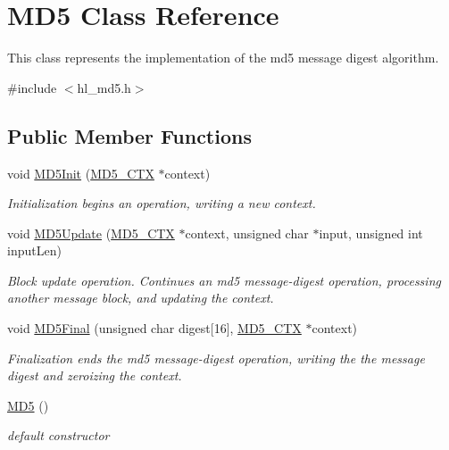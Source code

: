 \hypertarget{class_m_d5}{
\section{MD5 Class Reference}
\label{class_m_d5}
}


This class represents the implementation of the md5 message digest algorithm.  


{\ttfamily \#include $<$hl\_\-md5.h$>$}\subsection*{Public Member Functions}
\begin{DoxyCompactItemize}
\item 
void \hyperlink{class_m_d5_ad7a5fd3b9b97865ded5ac8ecd24905fc}{MD5Init} (\hyperlink{struct_m_d5___c_t_x}{MD5\_\-CTX} $\ast$context)
\begin{DoxyCompactList}\small\item\em Initialization begins an operation, writing a new context. \item\end{DoxyCompactList}\item 
void \hyperlink{class_m_d5_afdab8c1ad9a976589f78a64c534d2c54}{MD5Update} (\hyperlink{struct_m_d5___c_t_x}{MD5\_\-CTX} $\ast$context, unsigned char $\ast$input, unsigned int inputLen)
\begin{DoxyCompactList}\small\item\em Block update operation. Continues an md5 message-\/digest operation, processing another message block, and updating the context. \item\end{DoxyCompactList}\item 
void \hyperlink{class_m_d5_af527ca99477e2cff37a4f1952bcc7f90}{MD5Final} (unsigned char digest\mbox{[}16\mbox{]}, \hyperlink{struct_m_d5___c_t_x}{MD5\_\-CTX} $\ast$context)
\begin{DoxyCompactList}\small\item\em Finalization ends the md5 message-\/digest operation, writing the the message digest and zeroizing the context. \item\end{DoxyCompactList}\item 
\hyperlink{class_m_d5_afa6155ec36de415ab2dcf5e54b670d13}{MD5} ()
\begin{DoxyCompactList}\small\item\em default constructor \item\end{DoxyCompactList}\end{DoxyCompactItemize}


